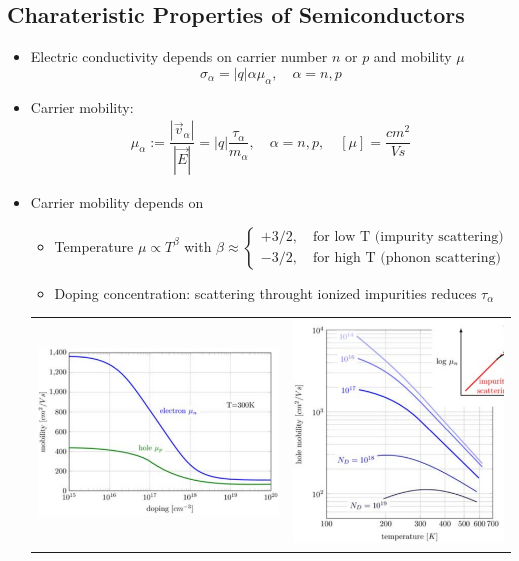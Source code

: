 \subsection{Charateristic Properties of Semiconductors}
\begin{itemize}
  \item Electric conductivity depends on carrier number $n$ or $p$ and mobility $\mu$
        \begin{equation*}
          \sigma_{\alpha} = |q|\alpha \mu_{\alpha}, \quad \alpha = n, p
        \end{equation*}
  \item Carrier mobility:
        \begin{align*}
          \mu_{\alpha} := \dfrac{|\vec{v}_{\alpha}|}{|\vec{E}|} = |q| \dfrac{\tau_{\alpha}}{m_{\alpha}}, \quad \alpha = n, p, \quad [\mu] = \dfrac{\si{cm^{2}}}{\si{Vs}}
        \end{align*}
  \item Carrier mobility depends on
        \begin{itemize}
                \item Temperature $\mu \propto T^{\beta}$ with $\beta \approx \begin{cases}+3/2, \quad \text{for low T (impurity scattering)}\\ -3/2, \quad \text{for high T (phonon scattering)} \end{cases}$
                \item Doping concentration: scattering throught ionized impurities reduces $\tau_{\alpha}$
        \end{itemize}
        \begin{tabular}{cc}
          \includegraphics[width=.25\textwidth]{content/bdml/pictures/electron_vs_hole_mobility}
          &
          \includegraphics[width=.22\textwidth]{content/bdml/pictures/hole_mobility_doping}
        \end{tabular}

\end{itemize}
